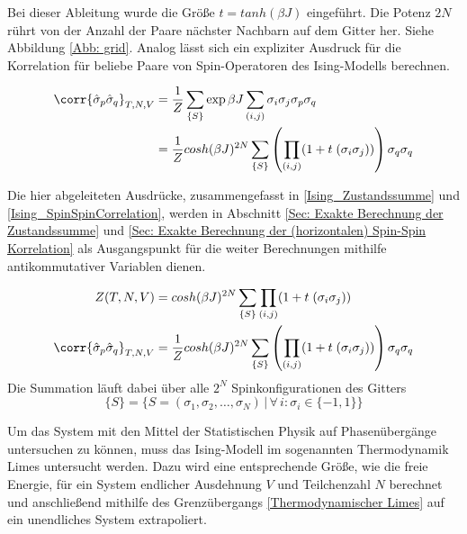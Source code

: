 \noindent Bei dieser Ableitung wurde die Größe $t = tanh(\beta J)$ eingeführt. Die Potenz $2N$ rührt von der Anzahl der Paare nächster Nachbarn auf dem Gitter her. Siehe Abbildung \ref{Abb: grid}. Analog lässt sich ein expliziter Ausdruck für die Korrelation für beliebe Paare von Spin-Operatoren des Ising-Modells berechnen.

\begin{align} 
    \corr{\hat{\sigma}_{p} \hat{\sigma}_{q} }_{T,N,V}  
    & = \frac{1}{Z} \sum_{\{S\}} \exp{\beta J \sum_{(i,j)} \sigma_i \sigma_j } \sigma_{p} \sigma_{q} \\
    & = \frac{1}{Z} cosh(\beta J)^{2N} \sum_{\{S\}} \left(\prod_{(i,j)} (1 +  t \; (\sigma_i \sigma_j) )\right) \sigma_{q} \sigma_{q} 
\end{align}

\noindent Die hier abgeleiteten Ausdrücke, zusammengefasst in  \eqref{Ising_Zustandssumme} und \eqref{Ising_SpinSpinCorrelation}, werden in Abschnitt \ref{Sec: Exakte Berechnung der Zustandssumme} und \ref{Sec: Exakte Berechnung der (horizontalen) Spin-Spin Korrelation} als Ausgangspunkt für die weiter Berechnungen mithilfe antikommutativer Variablen dienen.

\begin{grayframe}[frametitle = {Zustandssumme und Spin-Spin-Korrelation für 2d Ising-Modell}]
\begin{align}
 Z(T,N,V)  
  & = cosh(\beta J)^{2N} \sum_{\{S\}} \prod_{(i,j)} (1 +  t \; (\sigma_i \sigma_j)) \label{Ising_Zustandssumme} \\
\corr{\hat{\sigma}_{p} \hat{\sigma}_{q} }_{T,N,V} 
  & = \frac{1}{Z} cosh(\beta J)^{2N} \sum_{\{S\}} \left(\prod_{(i,j)} (1 +  t \; (\sigma_i \sigma_j) )\right) \sigma_{q} \sigma_{q} \label{Ising_SpinSpinCorrelation}
\end{align}
\centering
\noindent Die Summation läuft dabei über alle $2^N$ Spinkonfigurationen des Gitters
$$\{S\} = \{S = (\sigma_1, \sigma_2, \dots,\sigma_N) \,\vert\, \forall\,i : \sigma_i \in \{-1, 1\}\}$$
\end{grayframe}

\noindent Um das System mit den Mittel der Statistischen Physik auf Phasenübergänge untersuchen zu können, muss das Ising-Modell im sogenannten Thermodynamik Limes untersucht werden. Dazu wird eine entsprechende Größe, wie die freie Energie, für ein System endlicher Ausdehnung $V$ und Teilchenzahl $N$ berechnet und anschließend mithilfe des Grenzübergangs \eqref{Thermodynamischer Limes} auf ein unendliches System extrapoliert. 

